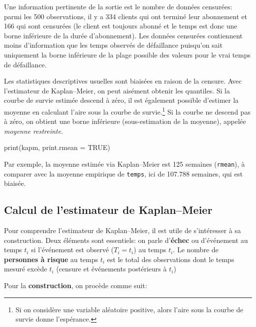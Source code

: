 \documentclass[
  11pt,
  letterpaper,
]{scrbook}
\newenvironment{Shaded}{\begin{snugshade}}{\end{snugshade}}
\newcommand{\AttributeTok}[1]{\textcolor[rgb]{0.40,0.45,0.13}{#1}}
\newcommand{\ConstantTok}[1]{\textcolor[rgb]{0.56,0.35,0.01}{#1}}
\newcommand{\FunctionTok}[1]{\textcolor[rgb]{0.28,0.35,0.67}{#1}}
\newcommand{\NormalTok}[1]{\textcolor[rgb]{0.00,0.23,0.31}{#1}}
\theoremstyle{definition}
\theoremstyle{remark}
\begin{document}
Une information pertinente de la sortie est le nombre de données
censurées: parmi les 500 observations, il y a 334 clients qui ont
terminé leur abonnement et 166 qui sont censurées (le client est
toujours abonné et le temps est donc une borne inférieure de la durée
d'abonnement). Les données censurées contiennent moins d'information que
les temps observés de défaillance puisqu'on sait uniquement la borne
inférieure de la plage possible des valeurs pour le vrai temps de
défaillance.

Les statistiques descriptives usuelles sont biaisées en raison de la
censure. Avec l'estimateur de Kaplan--Meier, on peut aisément obtenir
les quantiles. Si la courbe de survie estimée descend à zéro, il est
également possible d'estimer la moyenne en calculant l'aire sous la
courbe de survie.\footnote{Si on considère une variable aléatoire
  positive, alors l'aire sous la courbe de survie donne l'espérance.} Si
la courbe ne descend pas à zéro, on obtient une borne inférieure
(sous-estimation de la moyenne), appelée \emph{moyenne restreinte}.

\begin{Shaded}
\begin{Highlighting}[]
\FunctionTok{print}\NormalTok{(kapm, }\AttributeTok{print.rmean =} \ConstantTok{TRUE}\NormalTok{)}
\end{Highlighting}
\end{Shaded}

Par exemple, la moyenne estimée via Kaplan--Meier est 125 semaines
(\texttt{rmean}), à comparer avec la moyenne empirique de
\texttt{temps}, ici de 107.788 semaines, qui est biaisée.

\hypertarget{calcul-de-lestimateur-de-kaplanmeier}{%
\subsection{Calcul de l'estimateur de
Kaplan--Meier}\label{calcul-de-lestimateur-de-kaplanmeier}}

Pour comprendre l'estimateur de Kaplan--Meier, il est utile de
s'intéresser à sa construction. Deux éléments sont essentiels: on parle
d'\textbf{échec} ou d'événement au temps \(t_i\) si l'événement est
observé (\(T_i=t_i\)) au temps \(t_i\). Le nombre de \textbf{personnes à
risque} au temps \(t_i\) est le total des observations dont le temps
mesuré excède \(t_i\) (censure et événements postérieurs à \(t_i\))

Pour la \textbf{construction}, on procède comme suit:
\end{document}
